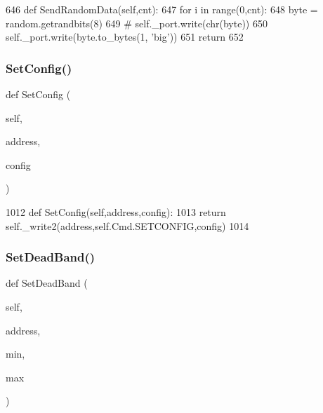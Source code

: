 \begin{DoxyCode}
646     \textcolor{keyword}{def }SendRandomData(self,cnt):
647         \textcolor{keywordflow}{for} i \textcolor{keywordflow}{in} range(0,cnt):
648             byte = random.getrandbits(8)
649 \textcolor{comment}{#           self.\_port.write(chr(byte))}
650             self.\_port.write(byte.to\_bytes(1, \textcolor{stringliteral}{'big'}))
651         \textcolor{keywordflow}{return}
652 
\end{DoxyCode}
\mbox{\label{classtoxic__hardware_1_1roboclaw__3_1_1Roboclaw_a28cd21a66d7035f83fc68d761c630a85}} 
\subsubsection{\texorpdfstring{Set\+Config()}{SetConfig()}}
{\footnotesize\ttfamily def Set\+Config (\begin{DoxyParamCaption}\item[{}]{self,  }\item[{}]{address,  }\item[{}]{config }\end{DoxyParamCaption})}


\begin{DoxyCode}
1012     \textcolor{keyword}{def }SetConfig(self,address,config):
1013         \textcolor{keywordflow}{return} self.\_write2(address,self.Cmd.SETCONFIG,config)
1014 
\end{DoxyCode}
\mbox{\label{classtoxic__hardware_1_1roboclaw__3_1_1Roboclaw_a5c7b72a7a931b568bb6598b3c9c88dde}} 
\subsubsection{\texorpdfstring{Set\+Dead\+Band()}{SetDeadBand()}}
{\footnotesize\ttfamily def Set\+Dead\+Band (\begin{DoxyParamCaption}\item[{}]{self,  }\item[{}]{address,  }\item[{}]{min,  }\item[{}]{max }\end{DoxyParamCaption})}


